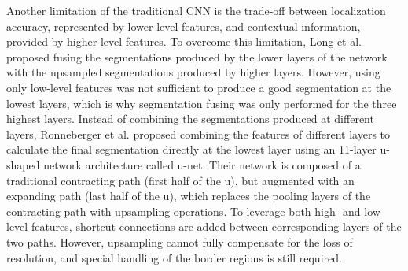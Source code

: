 Another limitation of the traditional CNN is the trade-off between localization
accuracy, represented by lower-level features, and contextual information,
provided by higher-level features. To overcome this limitation, Long et al.
\cite{long2015} proposed fusing the segmentations produced by the lower layers of the network
with the upsampled segmentations produced by higher layers. However, using only
low-level features was not sufficient to produce a good segmentation at the
lowest layers, which is why segmentation fusing was only performed for the three
highest layers.
Instead of combining the segmentations produced at
different layers, Ronneberger et al. \cite{ronneberger2015} proposed combining
the features of different layers to calculate the final segmentation
directly at the lowest layer using an 11-layer u-shaped network architecture
called u-net. Their network is
composed of a traditional contracting path (first half of the u), but augmented
with an expanding path (last half of the u), which replaces the pooling layers
of the contracting path with upsampling operations. To leverage both high- and
low-level features, shortcut connections are added between corresponding layers
of the two paths.
However,
upsampling cannot fully compensate for the loss of resolution, and special
handling of the border regions is still required.

% 

